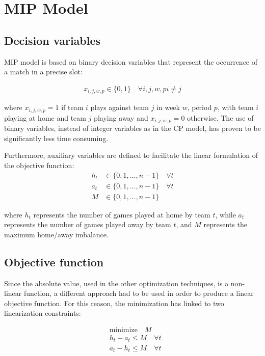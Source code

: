 \documentclass{article}
\begin{document}
\section{MIP Model}

\subsection{Decision variables}

MIP model is based on binary decision variables that represent the occurrence of a match in a precise slot:

\begin{align}
x_{i,j,w,p} \in \{0,1\} \quad \forall i,j, w, p i \neq j
\end{align}

where $x_{i,j,w,p} = 1$ if team $i$ plays against team $j$ in week $w$, period $p$, with team $i$ playing at home and team $j$ playing away and $x_{i,j,w,p} = 0$ otherwise. The use of binary variables, instead of integer variables as in the CP model, has proven to be significantly less time consuming.

Furthermore, auxiliary variables are defined to facilitate the linear formulation of the objective function:
\begin{align}
h_t &\in \{0, 1, \ldots, n-1\} \quad \forall t \\
a_t &\in \{0, 1, \ldots, n-1\} \quad \forall t \\
M &\in \{0, 1, \ldots, n-1\}
\end{align}

where $h_t$ represents the number of games played at home by team $t$, while $a_t$ represents the number of games played away by team $t$, and $M$ represents the maximum home/away imbalance.


\subsection{Objective function}
Since the absolute value, used in the other optimization techniques, is a non-linear function, a different approach had to be used in order to produce a linear objective function. 
For this reason, the minimization has linked to two linearization constraints:

\begin{align}
& \text{minimize} \quad M \\
& h_t - a_t \leq M \quad \forall t \\
& a_t - h_t \leq M \quad \forall t
\end{align}
\end{document}
